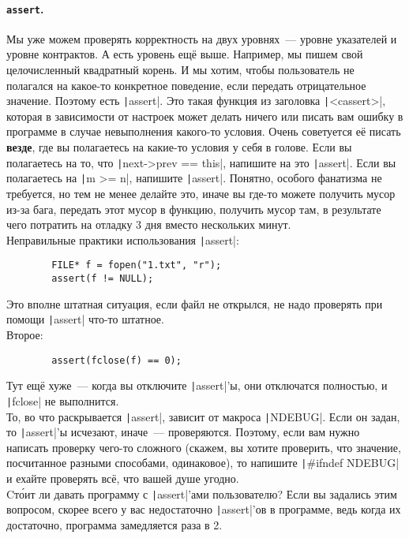 \documentclass{article}
\begin{document}
    \paragraph{\texttt{assert}.}
    Мы уже можем проверять корректность на двух уровнях~--- уровне указателей и уровне контрактов. А есть уровень ещё выше. Например, мы пишем свой целочисленный квадратный корень. И мы хотим, чтобы пользователь не полагался на какое-то конкретное поведение, если передать отрицательное значение. Поэтому есть \texttt|assert|. Это такая функция из заголовка \texttt|<cassert>|, которая в зависимости от настроек может делать ничего или писать вам ошибку в программе в случае невыполнения какого-то условия. Очень советуется её писать \textbf{везде}, где вы полагаетесь на какие-то условия у себя в голове. Если вы полагаетесь на то, что \texttt|next->prev == this|, напишите на это \texttt|assert|. Если вы полагаетесь на \texttt|m >= n|, напишите \texttt|assert|. Понятно, особого фанатизма не требуется, но тем не менее делайте это, иначе вы где-то можете получить мусор из-за бага, передать этот мусор в функцию, получить мусор там, в результате чего потратить на отладку 3 дня вместо нескольких минут.\\
    Неправильные практики использования \texttt|assert|:
    \begin{verbatim}
        FILE* f = fopen("1.txt", "r");
        assert(f != NULL);
    \end{verbatim}
    Это вполне штатная ситуация, если файл не открылся, не надо проверять при помощи \texttt|assert| что-то штатное.\\
    Второе:
    \begin{verbatim}
        assert(fclose(f) == 0);
    \end{verbatim}
    Тут ещё хуже~--- когда вы отключите \texttt|assert|'ы, они отключатся полностью, и \texttt|fclose| не выполнится.\\
    То, во что раскрывается \texttt|assert|, зависит от макроса \texttt|NDEBUG|. Если он задан, то \texttt|assert|'ы исчезают, иначе~--- проверяются. Поэтому, если вам нужно написать проверку чего-то сложного (скажем, вы хотите проверить, что значение, посчитанное разными способами, одинаковое), то напишите \texttt|#ifndef NDEBUG| и ехайте проверять всё, что вашей душе угодно.\\
    Cт\'{о}ит ли давать программу с \texttt|assert|'ами пользователю? Если вы задались этим вопросом, скорее всего у вас недостаточно \texttt|assert|'ов в программе, ведь когда их достаточно, программа замедляется раза в 2.
\end{document}

